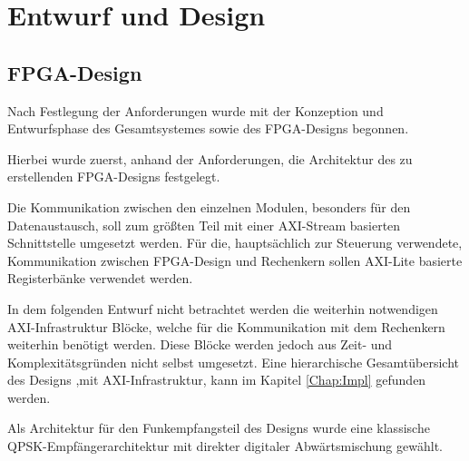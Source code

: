 \chapter{Entwurf und Design}
\section{\acs{FPGA}-Design}
Nach Festlegung der Anforderungen wurde mit der Konzeption und Entwurfsphase des Gesamtsystemes sowie des \acs{FPGA}-Designs begonnen.

Hierbei wurde zuerst, anhand der Anforderungen, die Architektur des zu erstellenden FPGA-Designs festgelegt.

Die Kommunikation zwischen den einzelnen Modulen, besonders für den Datenaustausch, soll zum größten Teil mit einer \acs{AXI}-Stream basierten 
Schnittstelle umgesetzt werden. Für die, hauptsächlich zur Steuerung verwendete, Kommunikation zwischen \acs{FPGA}-Design und Rechenkern sollen
\acs{AXI}-Lite basierte Registerbänke verwendet werden.

In dem folgenden Entwurf nicht betrachtet werden die weiterhin notwendigen \acs{AXI}-Infrastruktur Blöcke, welche für die Kommunikation mit dem Rechenkern weiterhin benötigt werden.
Diese Blöcke werden jedoch aus Zeit- und Komplexitätsgründen nicht selbst umgesetzt. 
Eine hierarchische Gesamtübersicht des Designs ,mit \acs{AXI}-Infrastruktur, kann im Kapitel \ref{Chap:Impl} gefunden werden.

Als Architektur für den Funkempfangsteil des Designs wurde eine klassische \acs{QPSK}-Empfängerarchitektur mit direkter digitaler Abwärtsmischung gewählt.

